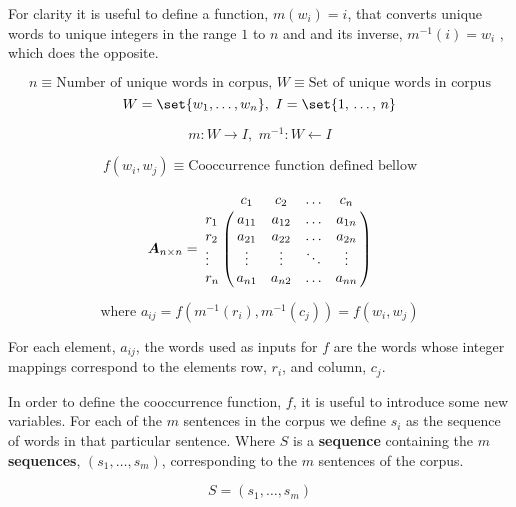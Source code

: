 \documentclass{article}
\begin{document}
For clarity it is useful to define a function, $m(w_i) = i$, that converts unique words to unique integers in the range $1$ to $n$ and and its inverse, $m^{-1}(i) = w_i$ , which does the opposite.

	\begin{equation*}
	n \equiv \text{Number of unique words in corpus, } W \equiv \text{Set of unique words in corpus}
	\end{equation*}
	\begin{equation*}
	W = \set {w_1,\ldots ,w_n} \text{, } \, I = \set {1,\,\ldots ,\,n}
	\end{equation*}
	
	\begin{equation*}
	m: W \rightarrow I \text{, } \, m^{-1}: W \leftarrow I
	\end{equation*}
	
	\begin{equation*}
	f(w_i,w_j) \equiv \text{Cooccurrence function defined bellow}
	\end{equation*}

\begin{equation*}
\mat{A}{n}{n}=
\bordermatrix{			&	c_1				&	c_2		&	\ldots 	&	c_n			\cr
                r_1		&	a_{11}			&  a_{12} 	& 	\ldots 	& 	a_{1n}		\cr
                r_2		&	a_{21} 			&  a_{22}	& 	\ldots 	& 	a_{2n}		\cr
                \vdots	& 	\vdots 			& 	\vdots 	& 	\ddots 	& 	\vdots		\cr
                r_n		&	a_{n1}			&  a_{n2}   &	\ldots 	& 	a_{nn}}
\end{equation*}

\begin{equation*}
\text{where } a_{ij} = f(m^{-1}(r_i),m^{-1}(c_j)) = f(w_i,w_j)
\end{equation*}

For each element, $a_{ij}$, the words used as inputs for $f$ are the words whose integer mappings correspond to the elements row, $r_i$, and column, $c_j$.


In order to define the cooccurrence function, $f$, it is useful to introduce some new variables. For each of the $m$ sentences in the corpus we define $s_i$ as the sequence of words in that particular sentence. Where $S$ is a \textbf{sequence} containing the $m$ \textbf{sequences}, $\left(s_1, \ldots, s_m \right)$, corresponding to the $m$ sentences of the corpus.

\begin{equation*}
S = \left( s_1, \ldots, s_m \right)
\end{equation*}
\end{document}
